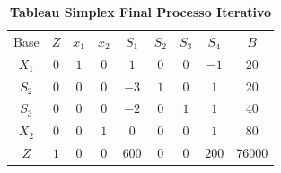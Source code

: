 \documentclass{beamer}
\begin{document}
\begin{frame}
	\begin{table}
		\caption{{\textbf{Tableau Simplex Final Processo Iterativo}}}
		\begin{tabular}{c c c c c c c c c}
			\cellcolor{blue} {\color{white} Base} &
			\cellcolor{blue} {\color{white} $Z$} &
			\cellcolor{blue} {\color{white} $x_1$} &
			\cellcolor{blue} {\color{white} $x_2$} &
			\cellcolor{blue} {\color{white} $S_1$} &
			\cellcolor{blue} {\color{white} $S_2$} &
			\cellcolor{blue} {\color{white} $S_3$} &
			\cellcolor{blue} {\color{white} $S_4$} &
			\cellcolor{blue} {\color{white} $B$} \\
			\cellcolor{blue} {\color{white} $X_1$} &
			\cellcolor{yellow} $0$& 
			\cellcolor{yellow} $1$& 
			\cellcolor{yellow} $0$& 
			\cellcolor{yellow} $1$& 
			\cellcolor{yellow} $0$& 
			\cellcolor{yellow} $0$& 
			\cellcolor{yellow} $-1$&
			\cellcolor{yellow} $20$\\
			\cellcolor{blue} {\color{white} $S_2$} &
			\cellcolor{yellow} $0$& 
			\cellcolor{yellow} $0$& 
			\cellcolor{yellow} $0$& 
			\cellcolor{yellow} $-3$& 
			\cellcolor{yellow} $1$& 
			\cellcolor{yellow} $0$& 
			\cellcolor{yellow} $1$&
			\cellcolor{yellow} $20$\\
			\cellcolor{blue} {\color{white} $S_3$} &
			\cellcolor{yellow} $0$& 
			\cellcolor{yellow} $0$& 
			\cellcolor{yellow} $0$& 
			\cellcolor{yellow} $-2$& 
			\cellcolor{yellow} $0$& 
			\cellcolor{yellow} $1$& 
			\cellcolor{yellow} $1$&
			\cellcolor{yellow} $40$\\
			\cellcolor{blue} {\color{white} $X_2$} &
			\cellcolor{yellow} $0$& 
			\cellcolor{yellow} $0$& 
			\cellcolor{yellow} $1$& 
			\cellcolor{yellow} $0$& 
			\cellcolor{yellow} $0$& 
			\cellcolor{yellow} $0$& 
			\cellcolor{yellow} $1$&
			\cellcolor{yellow} $80$\\
			\cellcolor{blue} {\color{white} $Z$} &
			\cellcolor{yellow} $1$& 
			\cellcolor{yellow} $0$& 
			\cellcolor{yellow} $0$& 
			\cellcolor{yellow} $600$& 
			\cellcolor{yellow} $0$& 
			\cellcolor{yellow} $0$& 
			\cellcolor{yellow} $200$&
			\cellcolor{yellow} $76000$\\
		\end{tabular}
	\end{table}
\end{frame}
\end{document}
